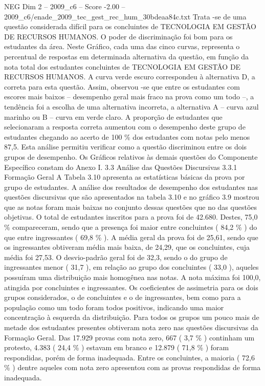 \begin{textsample}{NEG Dim 2 – 2009\_c6 – Score -2.00 – 2009\_c6/enade\_2009\_tec\_gest\_rec\_hum\_30bdeaa84c.txt}
Trata -se de uma questão considerada difícil para os concluintes de TECNOLOGIA EM GESTÃO DE RECURSOS HUMANOS.
O poder de discriminação foi bom para os estudantes da área.
Neste Gráfico, cada uma das cinco curvas, representa o percentual de respostas em determinada alternativa da questão, em função da nota total dos estudantes concluintes de TECNOLOGIA EM GESTÃO DE RECURSOS HUMANOS.
A curva verde escuro correspondeu à alternativa D, a correta para esta questão.
Assim, observou -se que entre os estudantes com escores mais baixos – desempenho geral mais fraco na prova como um todo –, a tendência foi a escolha de uma alternativa incorreta, a alternativa A – curva azul marinho ou B – curva em verde claro.
A proporção de estudantes que selecionaram a resposta correta aumentou com o desempenho deste grupo de estudantes chegando ao acerto de 100 \% dos estudantes com notas pelo menos 87,5.
Esta análise permitiu verificar como a questão discriminou entre os dois grupos de desempenho.
Os Gráficos relativos às demais questões do Componente Específico constam do Anexo I. 3.3 Análise das Questões Discursivas 3.3.1 Formação Geral A Tabela 3.10 apresenta as estatísticas básicas da prova por grupo de estudantes.
A análise dos resultados de desempenho dos estudantes nas questões discursivas que são apresentados na tabela 3.10 e no gráfico 3.9 mostrou que as notas foram mais baixas no conjunto dessas questões que no das questões objetivas.
O total de estudantes inscritos para a prova foi de 42.680.
Destes, 75,0 \% compareceram, sendo que a presença foi maior entre concluintes ( 84,2 \% ) do que entre ingressantes ( 69,8 \% ).
A média geral da prova foi de 25,61, sendo que os ingressantes obtiveram média mais baixa, de 24,29, que os concluintes, cuja média foi 27,53.
O desvio-padrão geral foi de 32,3, sendo o do grupo de ingressantes menor ( 31,7 ), em relação ao grupo dos concluintes ( 33,0 ), aqueles possuíram uma distribuição mais homogênea nas notas.
A nota máxima foi 100,0, atingida por concluintes e ingressantes.
Os coeficientes de assimetria para os dois grupos considerados, o de concluintes e o de ingressantes, bem como para a população como um todo foram todos positivos, indicando uma maior concentração à esquerda da distribuição.
Para todos os grupos um pouco mais de metade dos estudantes presentes obtiveram nota zero nas questões discursivas da Formação Geral.
Das 17.929 provas com nota zero, 667 ( 3,7 \% ) continham um protesto, 4.383 ( 24,4 \% ) estavam em branco e 12.879 ( 71,8 \% ) foram respondidas, porém de forma inadequada.
Entre os concluintes, a maioria ( 72,6 \% ) dentre aqueles com nota zero apresentou com as provas respondidas de forma inadequada.

\end{textsample}
